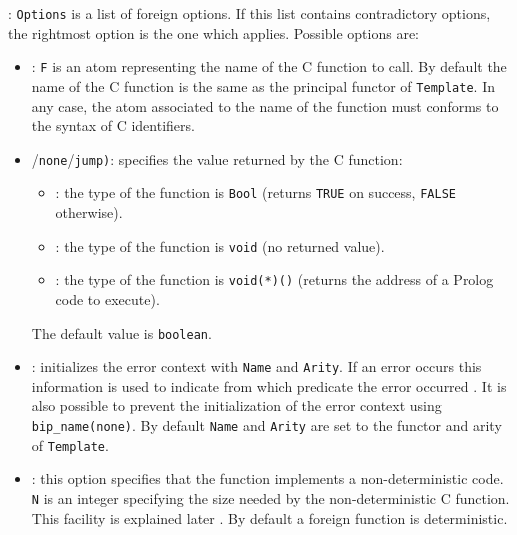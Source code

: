 : \texttt{Options} is a list of foreign options. If
this list contains contradictory options, the rightmost option is the one
which applies. Possible options are:

\begin{itemize}

\item {}: \texttt{F} is an atom representing
the name of the C function to call. By default the name of the C function is
the same as the principal functor of \texttt{Template}. In any case, the atom
associated to the name of the function must conforms to the syntax of C
identifiers.

\item {}/\texttt{none}/\texttt{jump)}:
specifies the value returned by the C function:

\begin{itemize}

\item {}: the type of the function is \texttt{Bool} (returns
\texttt{TRUE} on success, \texttt{FALSE} otherwise).

\item {}: the type of the function is \texttt{void} (no returned
value).

\item {}: the type of the function is \texttt{void(*)()} (returns
the address of a Prolog code to execute).

\end{itemize}

The default value is \texttt{boolean}.

\item {}: initializes the error
context with \texttt{Name} and \texttt{Arity}. If an error occurs this
information is used to indicate from which predicate the error occurred
. It is also possible to prevent the
initialization of the error context using \texttt{bip\_name(none)}. By
default \texttt{Name} and \texttt{Arity} are set to the functor and arity of
\texttt{Template}.

\item {}: this option specifies that the
function implements a non-deterministic code. \texttt{N} is an integer
specifying the size needed by the non-deterministic C function. This facility
is explained later . By default a
foreign function is deterministic.

\end{itemize}

